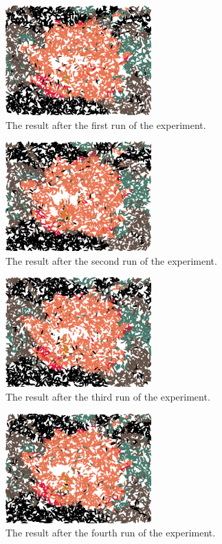 \documentclass[conference]{IEEEtran}
\begin{document}
\begin{figure}[htbp]
\centerline{\includegraphics[width=0.5\textwidth]{fig02.png}}
\caption{The result after the first run of the experiment.}
\label{fig02}
\end{figure}

\begin{figure}[htbp]
\centerline{\includegraphics[width=0.5\textwidth]{fig03.png}}
\caption{The result after the second run of the experiment.}
\label{fig03}
\end{figure}

\begin{figure}[htbp]
\centerline{\includegraphics[width=0.5\textwidth]{fig04.png}}
\caption{The result after the third run of the experiment.}
\label{fig04}
\end{figure}

\begin{figure}[htbp]
\centerline{\includegraphics[width=0.5\textwidth]{fig05.png}}
\caption{The result after the fourth run of the experiment.}
\label{fig05}
\end{figure}
\end{document}
